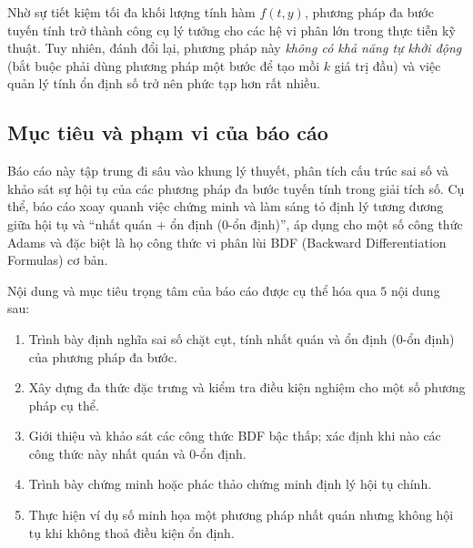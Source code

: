 Nhờ sự tiết kiệm tối đa khối lượng tính hàm $f(t, y)$, phương pháp đa bước tuyến tính trở thành công cụ lý tưởng cho các hệ vi phân lớn trong thực tiễn kỹ thuật. Tuy nhiên, đánh đổi lại, phương pháp này \textit{không có khả năng tự khởi động} (bắt buộc phải dùng phương pháp một bước để tạo mồi $k$ giá trị đầu) và việc quản lý tính ổn định số trở nên phức tạp hơn rất nhiều.


\subsection{Mục tiêu và phạm vi của báo cáo}

Báo cáo này tập trung đi sâu vào khung lý thuyết, phân tích cấu trúc sai số và khảo sát sự hội tụ của các phương pháp đa bước tuyến tính trong giải tích số. Cụ thể, báo cáo xoay quanh việc chứng minh và làm sáng tỏ định lý tương đương giữa hội tụ và ``nhất quán $+$ ổn định (0-ổn định)'', áp dụng cho một số công thức Adams và đặc biệt là họ công thức vi phân lùi BDF (Backward Differentiation Formulas) cơ bản.

Nội dung và mục tiêu trọng tâm của báo cáo được cụ thể hóa qua $5$ nội dung sau:
\begin{enumerate}
    \item Trình bày định nghĩa sai số chặt cụt, tính nhất quán và ổn định (0-ổn định) của phương pháp đa bước.
    \item Xây dựng đa thức đặc trưng và kiểm tra điều kiện nghiệm cho một số phương pháp cụ thể.
    \item Giới thiệu và khảo sát các công thức BDF bậc thấp; xác định khi nào các công thức này nhất quán và 0-ổn định.
    \item Trình bày chứng minh hoặc phác thảo chứng minh định lý hội tụ chính.
    \item Thực hiện ví dụ số minh họa một phương pháp nhất quán nhưng không hội tụ khi không thoả điều kiện ổn định.
\end{enumerate}





\newpage 
